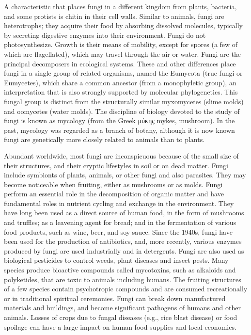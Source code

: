 A characteristic that places fungi in a different kingdom from plants, bacteria, and some protists is chitin in their cell walls. Similar to animals, fungi are heterotrophs; they acquire their food by absorbing dissolved molecules, typically by secreting digestive enzymes into their environment. Fungi do not photosynthesize. Growth is their means of mobility, except for spores (a few of which are flagellated), which may travel through the air or water. Fungi are the principal decomposers in ecological systems. These and other differences place fungi in a single group of related organisms, named the Eumycota (true fungi or Eumycetes), which share a common ancestor (from a monophyletic group), an interpretation that is also strongly supported by molecular phylogenetics. This fungal group is distinct from the structurally similar myxomycetes (slime molds) and oomycetes (water molds). The discipline of biology devoted to the study of fungi is known as mycology (from the Greek μύκης mykes, mushroom). In the past, mycology was regarded as a branch of botany, although it is now known fungi are genetically more closely related to animals than to plants.

Abundant worldwide, most fungi are inconspicuous because of the small size of their structures, and their cryptic lifestyles in soil or on dead matter. Fungi include symbionts of plants, animals, or other fungi and also parasites. They may become noticeable when fruiting, either as mushrooms or as molds. Fungi perform an essential role in the decomposition of organic matter and have fundamental roles in nutrient cycling and exchange in the environment. They have long been used as a direct source of human food, in the form of mushrooms and truffles; as a leavening agent for bread; and in the fermentation of various food products, such as wine, beer, and soy sauce. Since the 1940s, fungi have been used for the production of antibiotics, and, more recently, various enzymes produced by fungi are used industrially and in detergents. Fungi are also used as biological pesticides to control weeds, plant diseases and insect pests. Many species produce bioactive compounds called mycotoxins, such as alkaloids and polyketides, that are toxic to animals including humans. The fruiting structures of a few species contain psychotropic compounds and are consumed recreationally or in traditional spiritual ceremonies. Fungi can break down manufactured materials and buildings, and become significant pathogens of humans and other animals. Losses of crops due to fungal diseases (e.g., rice blast disease) or food spoilage can have a large impact on human food supplies and local economies.


